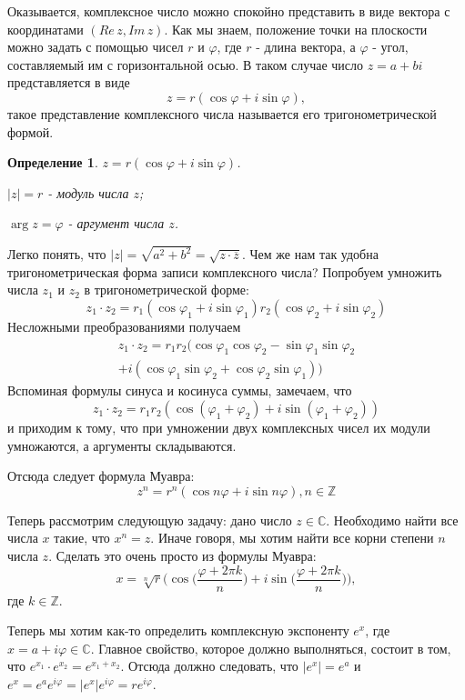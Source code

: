 \documentclass[a4paper,twocolumn,12pt]{article}			%
\newtheorem{definition}{Определение} %
\begin{document}
	Оказывается, комплексное число можно спокойно представить в виде вектора с координатами $(Re \, z, Im \, z)$. Как мы знаем, положение точки на плоскости можно задать с помощью чисел $r$ и $\varphi$, где $r$ - длина вектора, а $\varphi$ - угол, составляемый им с горизонтальной осью. В таком случае число $z = a + bi$ представляется в виде
	$$z = r(\cos\varphi + i\sin\varphi),$$
	такое представление комплексного числа называется его тригонометрической формой.
	
	\begin{definition}\label{4.23p154}
		$z = r(\cos\varphi + i\sin\varphi)$.	
		
		$|z| = r$ - модуль числа $z$;
		
		$\arg z = \varphi$ - аргумент числа $z$.
	\end{definition}
	\noindent Легко понять, что $|z| = \sqrt{a^2 + b^2} = \sqrt{z\cdot\overline{z}}$. Чем же нам так удобна тригонометрическая форма записи комплексного числа? Попробуем умножить числа $z_1$ и $z_2$ в тригонометрической форме:
	$$z_1\cdot z_2 = r_1(\cos\varphi_1 + i \sin\varphi_1)r_2(\cos\varphi_2 + i \sin\varphi_2)$$
	Несложными преобразованиями получаем
	\begin{multline*}
	z_1\cdot z_2 = r_1r_2(\cos\varphi_1\cos\varphi_2-\sin\varphi_1\sin\varphi_2 \\
	+ i(\cos\varphi_1\sin\varphi_2 + \cos\varphi_2\sin\varphi_1))
	\end{multline*}
	Вспоминая формулы синуса и косинуса суммы, замечаем, что $$z_1\cdot z_2 = r_1r_2(\cos(\varphi_1 + \varphi_2) + i\sin(\varphi_1 + \varphi_2))$$
	и приходим к тому, что при умножении двух комплексных чисел их модули умножаются, а аргументы складываются.
	
	Отсюда следует $\textit{формула Муавра:}$ $$z^n = r^n(\cos n\varphi + i\sin n\varphi), n \in \mathbb{Z}$$
	
	Теперь рассмотрим следующую задачу: дано число $z \in \mathbb{C}$. Необходимо найти все числа $x$ такие, что $x^n = z$. Иначе говоря, мы хотим найти все корни степени $n$ числа $z$. Сделать это очень просто из формулы Муавра:
	$$x = \sqrt[n]{r}\Big(\cos\big(\frac{\varphi + 2\pi k}{n}\big)+i\sin\big(\frac{\varphi + 2\pi k}{n}\big) \Big),$$
	где $k \in \mathbb{Z}$.
	
	Теперь мы хотим как-то определить комплексную экспоненту $e^{x}$, где $x = a + i\varphi \in \mathbb{C}$. Главное свойство, которое должно выполняться, состоит в том, что $e^{x_1} \cdot e^{x_2} = e^{x_1 + x_2}$. Отсюда должно следовать, что $|e^x| = e^a$ и $e^x = e^a e^{i\varphi} = |e^x|e^{i\varphi} = re^{i\varphi}$. 
	
\end{document}
